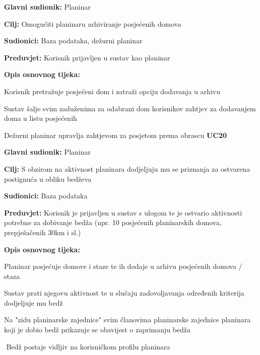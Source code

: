 			\noindent {}
		\begin{packed_item}
			
			\item \textbf{Glavni sudionik: }$ $Planinar$ $
			\item \textbf{Cilj:} $ $Omogućiti planinaru arhiviranje posjećenih domova$ $
			\item  \textbf{Sudionici:} $ $Baza podataka, dežurni planinar$ $
			\item  \textbf{Preduvjet:} $ $Korisnik prijavljen u sustav kao planinar$ $
			\item  \textbf{Opis osnovnog tijeka:}
			
			\item[] \begin{packed_enum}
				
				\item $ $Korisnik pretražuje posjećeni dom i zatraži opciju dodavanja u arhivu $ $
				\item $ $Sustav šalje svim  zaduženima za odabrani dom korisnikov zahtjev za dodavanjem doma u listu posjećenih$ $
				\item $ $Dežurni planinar upravlja zahtjevom za posjetom prema obrascu \textbf{UC20}$ $	
			\end{packed_enum}
	
		\end{packed_item}
	
		\noindent \underbar{\textbf{UC$ $22$ $ -$ $Zaslužiti priznanje (bedž)$ $}}
	\begin{packed_item}
		
		\item \textbf{Glavni sudionik: }$ $Planinar$ $
		\item  \textbf{Cilj:} $ $S obzirom na aktivnost planinara dodjeljuju mu se priznanja za ostvarena postignuća u obliku bedževa$ $
		\item  \textbf{Sudionici:} $ $Baza podataka$ $
		\item  \textbf{Preduvjet:} $ $Korisnik je prijavljen u sustav s ulogom  te je ostvario aktivnosti potrebne za dobivanje bedža (npr. 10 posjećenih planinarskih domova, prepješačenih 30km i sl.)$ $
		\item  \textbf{Opis osnovnog tijeka:}
		
		\item[] \begin{packed_enum}
			
			\item $ $Planinar posjećuje domove i staze te ih dodaje u arhivu posjećenih domova / staza$ $
			\item $ $Sustav prati njegovu aktivnost te u slučaju zadovoljavanja određenih kriterija dodjeljuje mu bedž$ $
			\item $ $Na "zidu planinarske zajednice" svim članovima planinarske zajednice planinara koji je dobio bedž prikazuje se obavijest o zaprimanju bedža$ $
			\item $ $ Bedž postaje vidljiv na korisničkom profilu planinara$ $
		\end{packed_enum}
	\end{packed_item}	
	
